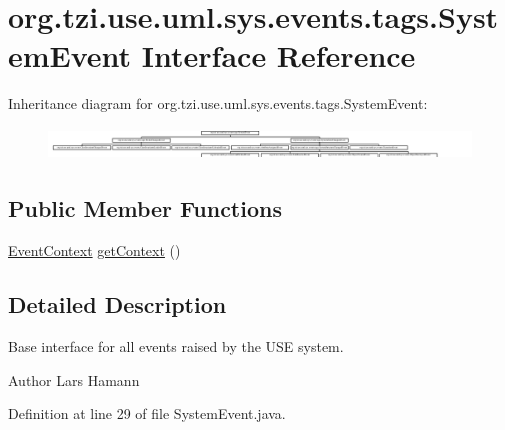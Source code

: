 \hypertarget{interfaceorg_1_1tzi_1_1use_1_1uml_1_1sys_1_1events_1_1tags_1_1_system_event}{\section{org.\-tzi.\-use.\-uml.\-sys.\-events.\-tags.\-System\-Event Interface Reference}
\label{interfaceorg_1_1tzi_1_1use_1_1uml_1_1sys_1_1events_1_1tags_1_1_system_event}
}
Inheritance diagram for org.\-tzi.\-use.\-uml.\-sys.\-events.\-tags.\-System\-Event\-:\begin{figure}[H]
\begin{center}
\leavevmode
\includegraphics[height=0.860215cm]{interfaceorg_1_1tzi_1_1use_1_1uml_1_1sys_1_1events_1_1tags_1_1_system_event}
\end{center}
\end{figure}
\subsection*{Public Member Functions}
\begin{DoxyCompactItemize}
\item 
\hyperlink{enumorg_1_1tzi_1_1use_1_1uml_1_1sys_1_1events_1_1tags_1_1_event_context}{Event\-Context} \hyperlink{interfaceorg_1_1tzi_1_1use_1_1uml_1_1sys_1_1events_1_1tags_1_1_system_event_ab7043264f059d52336a8c4f68e2a00fe}{get\-Context} ()
\end{DoxyCompactItemize}


\subsection{Detailed Description}
Base interface for all events raised by the U\-S\-E system. \begin{DoxyAuthor}{Author}
Lars Hamann 
\end{DoxyAuthor}


Definition at line 29 of file System\-Event.\-java.



